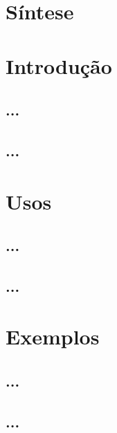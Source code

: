 \documentclass[12pt]{beamer}
\begin{document}
\begin{frame}
    \titlepage
\end{frame}

\section*{Síntese}
\begin{frame}
    \tableofcontents
\end{frame}


\section{Introdução}

\subsection{...}
\begin{frame}
\end{frame}

\subsection{...}
\begin{frame}
\end{frame}


\section{Usos}

\subsection{...}
\begin{frame}
\end{frame}

\subsection{...}
\begin{frame}
\end{frame}


\section{Exemplos}

\subsection{...}
\begin{frame}
\end{frame}

\subsection{...}
\begin{frame}
\end{frame}
\end{document}
